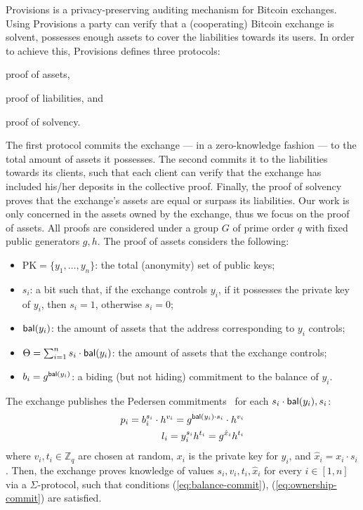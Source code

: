 Provisions is a privacy-preserving auditing mechanism for Bitcoin exchanges.
Using Provisions a party can verify that a (cooperating) Bitcoin exchange is
solvent, \ie possesses enough assets to cover the liabilities towards its
users. In order to achieve this, Provisions defines three protocols:
\begin{inparaenum}[i)]
    \item proof of assets,
    \item proof of liabilities, and
    \item proof of solvency.
\end{inparaenum}
The first protocol commits the exchange --- in a zero-knowledge fashion --- to
the total amount of assets it possesses. The second commits it to the
liabilities towards its clients, such that each client can verify that the
exchange has included his/her deposits in the collective proof. Finally, the
proof of solvency proves that the exchange's assets are equal or surpass its
liabilities.
Our work is only concerned in the assets owned by the exchange, thus we focus
on the proof of assets. All proofs are considered under a group $G$ of prime
order $q$ with fixed public generators $g, h$. The proof of assets considers
the following:
\begin{itemize}
    \item $\text{PK} = \{y_1, \dots, y_n \}$: the total (anonymity) set of public keys;
    \item $s_i$: a bit such that, if the exchange controls $y_i$, \ie if it possesses the private key of $y_i$, then $s_i = 1$, otherwise $s_i = 0$;
    \item $\mathsf{bal}(y_i)$: the amount of assets that the address corresponding to $y_i$ controls;
    \item $\Theta = \sum_{i = 1}^n s_i \cdot \mathsf{bal}(y_i)$: the amount of assets that the exchange controls;
    \item $b_i = g^{\mathsf{bal}(y_i)}$: a biding (but not hiding) commitment  to the balance of $y_i$.
\end{itemize}
The exchange publishes the Pedersen commitments~\cite{C:Pedersen91} for each $s_i \cdot
\mathsf{bal}(y_i), s_i$:
\begin{align}
    p_i = b_i^{s_i} \cdot h^{v_i} = g^{\mathsf{bal}(y_i) \cdot s_i} \cdot h^{v_i} \label{eq:balance-commit} \\
    l_i = y_i^{s_i}h^{t_i} =  g^{\hat{x}_i}h^{t_i} \label{eq:ownership-commit}
\end{align}
where $v_i, t_i \in \mathbb{Z}_q$ are chosen at random,
$x_i$ is the private key for $y_i$, and $\hat{x}_i = x_i \cdot s_i$.
Then, the exchange proves knowledge of values $s_i, v_i, t_i, \hat{x}_i$ for every $i
\in [1, n]$ via a $\Sigma$-protocol, such that conditions
(\ref{eq:balance-commit}), (\ref{eq:ownership-commit}) are satisfied.

